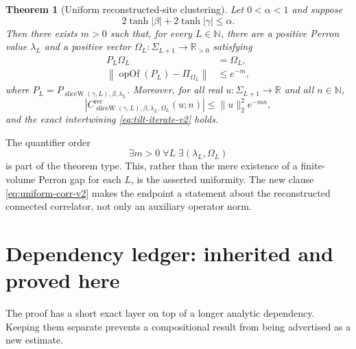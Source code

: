 \documentclass[11pt]{article}
\newtheorem{theorem}{Theorem}[section]
\newcommand{\R}{\mathbb R}
\newcommand{\N}{\mathbb N}
\begin{document}
\begin{theorem}[Uniform reconstructed-site clustering]\label{thm:uniform-v2}
Let $0<\alpha<1$ and suppose
\begin{equation}\label{eq:window-v2}
 2\tanh|\beta|+2\tanh|\gamma|\leq\alpha.
\end{equation}
Then there exists $m>0$ such that, for every $L\in\N$, there are a positive
Perron value $\lambda_L$ and a positive vector
$\Omega_L:\Sigma_{L+1}\to\R_{>0}$ satisfying
\begin{align}
 P_L\Omega_L&=\Omega_L,\label{eq:fixed-v2}\\
 \left\|\operatorname{opOf}(P_L)-\Pi_{\Omega_L}\right\|
   &\leq e^{-m},\label{eq:gap-v2}
\end{align}
where
$P_L=P_{\operatorname{sliceW}(\gamma,L),\beta,\lambda_L}$.  Moreover, for all
real $u:\Sigma_{L+1}\to\R$ and all $n\in\N$,
\begin{equation}\label{eq:uniform-corr-v2}
 \left|C^{\mathrm{rec}}_{
   \operatorname{sliceW}(\gamma,L),\beta,\lambda_L,\Omega_L}(u;n)\right|
 \leq \|u\|_2^2 e^{-mn},
\end{equation}
and the exact intertwining \eqref{eq:tilt-iterate-v2} holds.
\end{theorem}

The quantifier order
\[
 \exists m>0\;\forall L\;\exists(\lambda_L,\Omega_L)
\]
is part of the theorem type.  This, rather than the mere existence of a
finite-volume Perron gap for each $L$, is the asserted uniformity.  The new
clause \eqref{eq:uniform-corr-v2} makes the endpoint a statement about the
reconstructed connected correlator, not only an auxiliary operator norm.

\section{Dependency ledger: inherited and proved here}

The proof has a short exact layer on top of a longer analytic dependency.
Keeping them separate prevents a compositional result from being advertised
as a new estimate.
\end{document}
